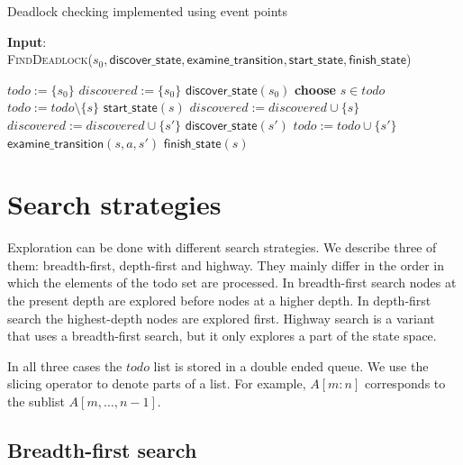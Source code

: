 \documentclass{article}
\begin{document}
\begin{algorithm}
\small
\caption{Deadlock checking implemented using event points}
\vspace*{1ex}
{\textbf{Input}:} \\
\textsc{FindDeadlock}($s_0, \textsf{discover\_state}, \textsf{examine\_transition},\textsf{start\_state}, \textsf{finish\_state}$)
\begin{algorithmic}[1]
\State \Comment {}
\State $todo := \{ s_0 \}$
\State $discovered := \{ s_0 \}$
\State $\textsf{discover\_state}(s_0)$
  \State \textbf{choose} $s \in todo$
  \State $todo := todo \setminus \{s\}$
  \State $\textsf{start\_state}(s)$ \Comment {}
  \State $discovered := discovered \cup \{s\}$
      \State $discovered := discovered \cup \{s' \}$
      \State $\textsf{discover\_state}(s')$
      \State $todo := todo \cup \{ s' \}$
    \EndIf
    \State $\textsf{examine\_transition}(s, a, s')$ \Comment {}
  \EndFor
  \State $\textsf{finish\_state}(s)$ \Comment {}
\EndWhile
\end{algorithmic}
\end{algorithm}

\newpage
\section{Search strategies}

Exploration can be done with different search strategies. We describe three of them: breadth-first, depth-first and highway. They mainly differ in the order in which the elements of the todo set are processed. In breadth-first search nodes at the present depth are explored before nodes at a higher depth. In depth-first search the highest-depth nodes are explored first. Highway search is a variant that uses a breadth-first search, but it only explores a part of the state space.

In all three cases the $todo$ list is stored in a double ended queue. We use the slicing operator to denote parts of a list. For example, $A[m:n]$ corresponds to the sublist $A[m,\ldots,n-1]$.

\subsection{Breadth-first search}
\end{document}
